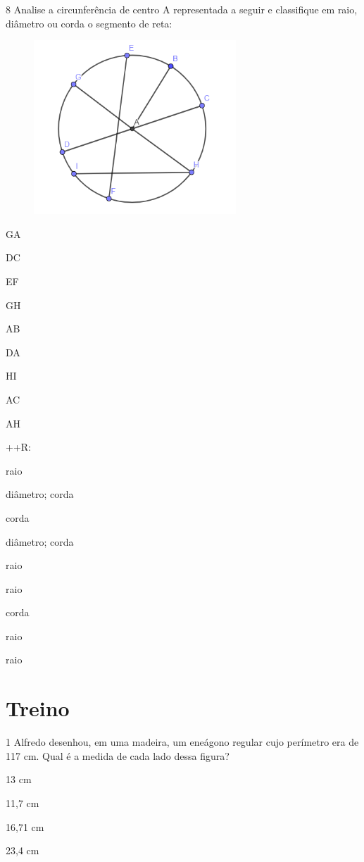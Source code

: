 \num{8} Analise a circunferência de centro A representada a seguir e
classifique em raio, diâmetro ou corda o segmento de reta:

\begin{figure}[H]
\centering\includegraphics[width=2.98681in,height=2.57292in]{./imgSAEB_8_MAT/media/image12.png}
\end{figure}
\item GA
\item DC
\item EF
\item GH
\item AB
\item DA
\item HI
\item AC
\item AH

++R:
\item raio
\item diâmetro; corda
\item corda
\item diâmetro; corda
\item raio
\item raio
\item corda
\item raio
\item raio

\section{Treino}

\num{1} Alfredo desenhou, em uma madeira, um eneágono regular cujo perímetro
era de 117 cm. Qual é a medida de cada lado dessa figura?
\item 13 cm
\item 11,7 cm
\item 16,71 cm
\item 23,4 cm

